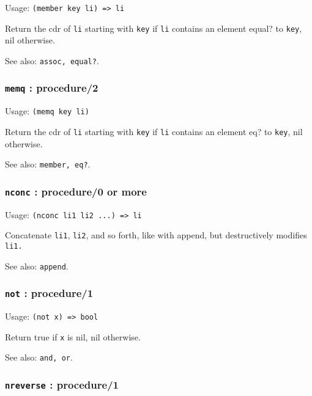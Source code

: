 \documentclass[
]{article}
\newcommand{\passthrough}[1]{#1}
\begin{document}
Usage: \passthrough{\lstinline!(member key li) => li!}

Return the cdr of \passthrough{\lstinline!li!} starting with
\passthrough{\lstinline!key!} if \passthrough{\lstinline!li!} contains
an element equal? to \passthrough{\lstinline!key!}, nil otherwise.

See also: \passthrough{\lstinline!assoc, equal?!}.

\hypertarget{memq-procedure2}{%
\subsubsection{\texorpdfstring{\texttt{memq} :
procedure/2}{memq : procedure/2}}\label{memq-procedure2}}

Usage: \passthrough{\lstinline!(memq key li)!}

Return the cdr of \passthrough{\lstinline!li!} starting with
\passthrough{\lstinline!key!} if \passthrough{\lstinline!li!} contains
an element eq? to \passthrough{\lstinline!key!}, nil otherwise.

See also: \passthrough{\lstinline!member, eq?!}.

\hypertarget{nconc-procedure0-or-more}{%
\subsubsection{\texorpdfstring{\texttt{nconc} : procedure/0 or
more}{nconc : procedure/0 or more}}\label{nconc-procedure0-or-more}}

Usage: \passthrough{\lstinline!(nconc li1 li2 ...) => li!}

Concatenate \passthrough{\lstinline!li1!},
\passthrough{\lstinline!li2!}, and so forth, like with append, but
destructively modifies \passthrough{\lstinline!li1.!}

See also: \passthrough{\lstinline!append!}.

\hypertarget{not-procedure1}{%
\subsubsection{\texorpdfstring{\texttt{not} :
procedure/1}{not : procedure/1}}\label{not-procedure1}}

Usage: \passthrough{\lstinline!(not x) => bool!}

Return true if \passthrough{\lstinline!x!} is nil, nil otherwise.

See also: \passthrough{\lstinline!and, or!}.

\hypertarget{nreverse-procedure1}{%
\subsubsection{\texorpdfstring{\texttt{nreverse} :
procedure/1}{nreverse : procedure/1}}\label{nreverse-procedure1}}
\end{document}
